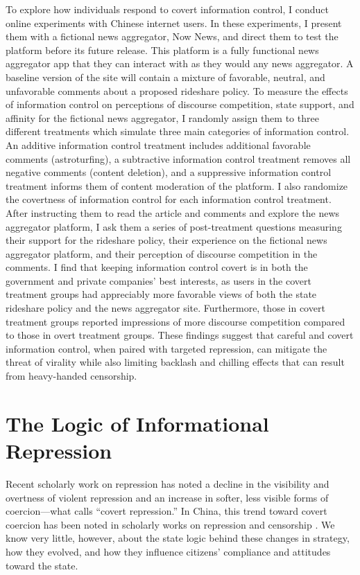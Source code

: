 \documentclass[11pt]{article}
\begin{document}
To explore how individuals respond to covert information control, I conduct online experiments with Chinese internet users. In these experiments, I present them with a fictional news aggregator, Now News, and direct them to test the platform before its future release. This platform is a fully functional news aggregator app that they can interact with as they would any news aggregator. A baseline version of the site will contain a mixture of favorable, neutral, and unfavorable comments about a proposed rideshare policy. To measure the effects of information control on perceptions of discourse competition, state support, and affinity for the fictional news aggregator, I randomly assign them to three different treatments which simulate three main categories of information control. An additive information control treatment includes additional favorable comments (astroturfing), a subtractive information control treatment removes all negative comments (content deletion), and a suppressive information control treatment informs them of content moderation of the platform. I also randomize the covertness of information control for each information control treatment. After instructing them to read the article and comments and explore the news aggregator platform, I ask them a series of post-treatment questions measuring their support for the rideshare policy, their experience on the fictional news aggregator platform, and their perception of discourse competition in the comments. I find that keeping information control covert is in both the government and private companies' best interests, as users in the covert treatment groups had appreciably more favorable views of both the state rideshare policy and the news aggregator site. Furthermore, those in covert treatment groups reported impressions of more discourse competition compared to those in overt treatment groups. These findings suggest that careful and covert information control, when paired with targeted repression, can mitigate the threat of virality while also limiting backlash and chilling effects that can result from heavy-handed censorship.

\section{The Logic of Informational Repression}

Recent scholarly work on repression has noted a decline in the visibility and overtness of violent repression \citep{fariss2014respect,fariss2019yes,guriev2019informational,hassan2022political} and an increase in softer, less visible forms of coercion---what \cite{davenport2005understanding} calls ``covert repression.'' In China, this trend toward covert coercion has been noted in scholarly works on repression \citep{gallagher2021not,ong2018thugs} and censorship \citep{crete2016harmonize, ruan2021information, miller2018limits, miller2018delegated}. We know very little, however, about the state logic behind these changes in strategy, how they evolved, and how they influence citizens' compliance and attitudes toward the state.
\end{document}
